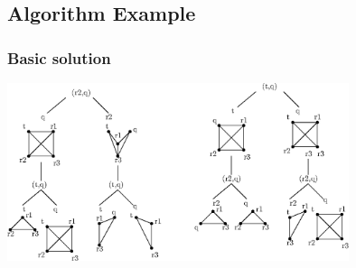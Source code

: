 \documentclass{beamer}
\begin{document}
\subsection{Algorithm Example}
\begin{frame}
\frametitle{Basic solution}
	\includegraphics[width=10cm]{re.eps}
\end{frame}


\end{document}
